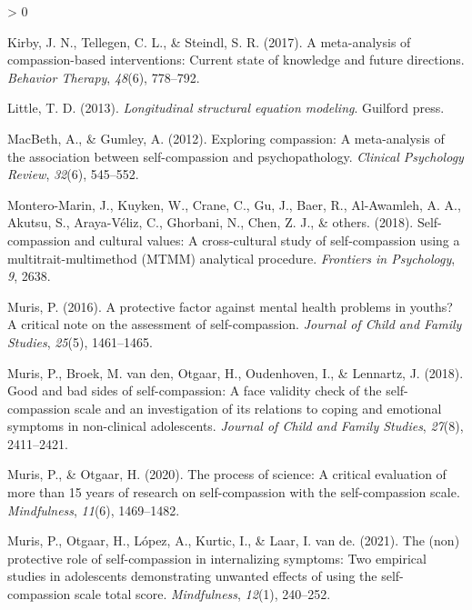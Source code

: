 \documentclass[
  english,
  man,floatsintext]{apa7}
\newlength{\cslhangindent}
\newenvironment{CSLReferences}[2] %
 {%
  \setlength{\parindent}{0pt}
  \ifodd #1 \everypar{\setlength{\hangindent}{\cslhangindent}}\ignorespaces\fi
  \ifnum #2 > 0
  \setlength{\parskip}{#2\baselineskip}
  \fi
 }%
 {}
\begin{document}
\begin{CSLReferences}{1}{0}
\leavevmode\hypertarget{ref-kirby2017meta}{}%
Kirby, J. N., Tellegen, C. L., \& Steindl, S. R. (2017). A meta-analysis of compassion-based interventions: Current state of knowledge and future directions. \emph{Behavior Therapy}, \emph{48}(6), 778--792.

\leavevmode\hypertarget{ref-little2013longitudinal}{}%
Little, T. D. (2013). \emph{Longitudinal structural equation modeling}. Guilford press.

\leavevmode\hypertarget{ref-macbeth2012exploring}{}%
MacBeth, A., \& Gumley, A. (2012). Exploring compassion: A meta-analysis of the association between self-compassion and psychopathology. \emph{Clinical Psychology Review}, \emph{32}(6), 545--552.

\leavevmode\hypertarget{ref-montero2018self}{}%
Montero-Marin, J., Kuyken, W., Crane, C., Gu, J., Baer, R., Al-Awamleh, A. A., Akutsu, S., Araya-Véliz, C., Ghorbani, N., Chen, Z. J., \& others. (2018). Self-compassion and cultural values: A cross-cultural study of self-compassion using a multitrait-multimethod (MTMM) analytical procedure. \emph{Frontiers in Psychology}, \emph{9}, 2638.

\leavevmode\hypertarget{ref-muris2016protective}{}%
Muris, P. (2016). A protective factor against mental health problems in youths? A critical note on the assessment of self-compassion. \emph{Journal of Child and Family Studies}, \emph{25}(5), 1461--1465.

\leavevmode\hypertarget{ref-muris2018good}{}%
Muris, P., Broek, M. van den, Otgaar, H., Oudenhoven, I., \& Lennartz, J. (2018). Good and bad sides of self-compassion: A face validity check of the self-compassion scale and an investigation of its relations to coping and emotional symptoms in non-clinical adolescents. \emph{Journal of Child and Family Studies}, \emph{27}(8), 2411--2421.

\leavevmode\hypertarget{ref-muris2020process}{}%
Muris, P., \& Otgaar, H. (2020). The process of science: A critical evaluation of more than 15 years of research on self-compassion with the self-compassion scale. \emph{Mindfulness}, \emph{11}(6), 1469--1482.

\leavevmode\hypertarget{ref-muris2021non}{}%
Muris, P., Otgaar, H., López, A., Kurtic, I., \& Laar, I. van de. (2021). The (non) protective role of self-compassion in internalizing symptoms: Two empirical studies in adolescents demonstrating unwanted effects of using the self-compassion scale total score. \emph{Mindfulness}, \emph{12}(1), 240--252.


\end{CSLReferences}
\end{document}
